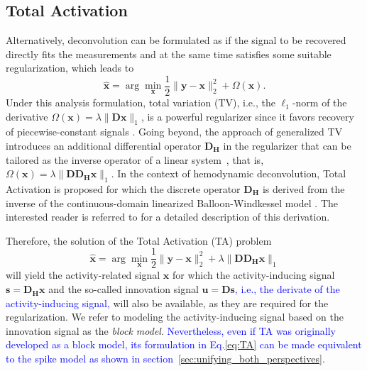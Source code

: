 \subsection{Total Activation}
Alternatively, deconvolution can be formulated as if the signal to be recovered
directly fits the measurements and at the same time satisfies some suitable
regularization, which leads to
\begin{equation}
\label{eq:analysis_model}
    \hat{\mathbf{x}} = \arg \min_{\mathbf{x}} \frac{1}{2} \| \mathbf{y} - \mathbf{x} \|_2^2 + \Omega(\mathbf{x}).
\end{equation}
Under this analysis formulation, total variation (TV), i.e., the $\ell_1$-norm
of the derivative $\Omega(\mathbf{x})=\lambda \|\mathbf{Dx}\|_1$, is a powerful
regularizer since it favors recovery of piecewise-constant signals
\citep{Chambolle2004TotalVariation}. Going beyond, the approach of generalized
TV introduces an additional differential operator $\mathbf{D_H}$ in the
regularizer that can be tailored as the inverse operator of a linear
system~\citep{Karahanoglu2011SignalProcessingApproach}, that is,
$\Omega(\mathbf{x})=\lambda \|\mathbf{D D_H x}\|_1$. In the context of
hemodynamic deconvolution, Total Activation is proposed for which the discrete
operator $\mathbf{D_H}$ is derived from the inverse of the continuous-domain
linearized Balloon-Windkessel model
\citep{Buxton1998BalloonModel,Friston2000Nonlinear-Balloon}. %
The interested reader is referred to
\citep{Khalidov2011ActiveletsWaveletssparse,Karahanoglu2011SignalProcessingApproach,
Karahanoglu2013TotalactivationfMRI} for a detailed description of this
derivation. 

Therefore, the solution of the Total Activation (TA) problem
\begin{equation}
\label{eq:TA}
    \hat{\mathbf{x}} = \arg \min_{\mathbf{x}} \frac{1}{2} \| \mathbf{y} - \mathbf{x} \|_2^2 + \lambda \|\mathbf{D D_H x} \|_1
\end{equation}
will yield the activity-related signal $\mathbf{x}$ for which the
activity-inducing signal $\mathbf{s}=\mathbf{D_H x}$ and the so-called
innovation signal $\mathbf{u}=\mathbf{Ds}$\textcolor{blue}{, i.e., the derivate
of the activity-inducing signal,} will also be available, as they are required
for the regularization. We refer to modeling the activity-inducing signal based
on the innovation signal as the \textit{block model}.
\textcolor{blue}{Nevertheless, even if TA was originally developed as a block
model, its formulation in Eq.\eqref{eq:TA} can be made equivalent to the spike
model as shown in section~\ref{sec:unifying_both_perspectives}.}

